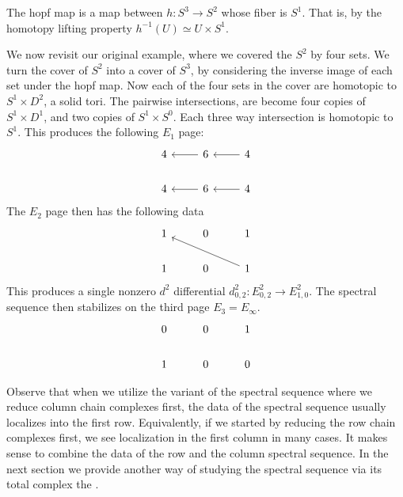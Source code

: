 The hopf map is a map between $h: S^3 \rightarrow S^2$ whose fiber is $S^1$. That is, by the homotopy lifting property $h^{-1}(U) \simeq U \times S^1$. 
\begin{example}
We now revisit our original example, where we covered the $S^2$ by four sets. We turn the cover of $S^2$ into a cover of $S^3$, by considering the inverse image of each set under the hopf map. Now each of the four sets in the cover are homotopic to $S^1 \times D^2$, a solid tori. The pairwise intersections, are become four copies of $S^1 \times D^1$, and two copies of $S^1 \times S^0$. Each three way intersection is homotopic to $S^1$.
This produces the following $E_1$ page:
\[ \begin{tikzcd}
4    &  \arrow{l} 6     & \arrow{l}   4   \\
4    & \arrow{l}  6     & \arrow{l}   4
\end{tikzcd} \]
The $E_2$ page then has the following data
\[
\begin{tikzcd}
1    &  0     &   1   \\
1   &  0     &   \arrow{llu}1
\end{tikzcd} 
\]
This produces a single nonzero $d^2$ differential $d^2_{0,2}: E^2_{0,2} \rightarrow E^2_{1,0}$.
The spectral sequence then stabilizes on the third page $E_3 = E_\infty$.
\[
\begin{tikzcd}
0    &  0     &   1   \\
1   &  0     &    0
\end{tikzcd} 
\]
\end{example}

Observe that when we utilize the variant of the spectral sequence where we reduce column chain complexes first, the data of the spectral sequence usually localizes into the first row. Equivalently, if we started by reducing the row chain complexes first, we see localization in the first column in many cases. It makes sense to combine the data of the row and the column spectral sequence. In the next section we provide another way of studying the \mv spectral sequence via its total complex the \mvb. 